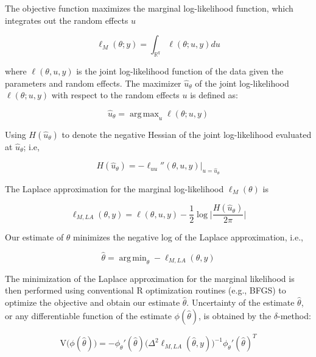 \documentclass[preprint, 3p,
authoryear]{elsarticle} %
\begin{document}
The objective function maximizes the marginal log-likelihood function,
which integrates out the random effects \(u\)

\begin{equation}
  \ell_{M}(\theta; y)=\int_{\mathbb{R}^{q}} \ell (\theta;u,y) du
\end{equation}

where \(\ell(\theta, u,y)\) is the joint log-likelihood function of the
data given the parameters and random effects. The maximizer
\(\hat{u}_{\theta}\) of the joint log-likelihood \(\ell(\theta;u,y)\)
with respect to the random effects \(u\) is defined as:

\begin{equation}
  \hat{u}_{\theta}=\mathop{\mathrm{arg\,max}}_{u} \ell(\theta;u,y)
\end{equation}

Using \(H(\hat{u}_{\theta})\) to denote the negative Hessian of the
joint log-likelihood evaluated at \(\hat{u}_{\theta}\); i.e,

\begin{equation}
  H(\hat{u}_{\theta}) =-\ell_{uu}''(\theta, u, y)|_{u=\hat{u}_{\theta}}
\end{equation}

The Laplace approximation for the marginal log-likelihood
\(\ell_M(\theta)\) is

\begin{equation}
  \ell_{M,LA}(\theta, y)=\ell(\theta,u,y)-\frac{1}{2}\log \Big|\frac{H(\hat{u}_{\theta})}{2\pi}\Big|
\end{equation}

Our estimate of \(\theta\) minimizes the negative log of the Laplace
approximation, i.e.,

\begin{equation}
  \hat{\theta}=\mathop{\mathrm{arg\,min}}_{\theta} - \ell_{M, LA}(\theta, y)
\end{equation}

The minimization of the Laplace approximation for the marginal
likelihood is then performed using conventional R optimization routines
(e.g., BFGS) to optimize the objective and obtain our estimate
\(\hat{\theta}\). Uncertainty of the estimate \(\hat{\theta}\), or any
differentiable function of the estimate \(\phi(\hat{\theta})\), is
obtained by the \(\delta\)-method:

\begin{equation}
  \mathrm{V}\big(\phi(\hat{\theta})\big)=-\phi_{\theta}'(\hat{\theta})\Big(\Delta^2 \ell_{M,LA}(\hat{\theta}, y)\Big)^{-1} \phi_{\theta}'(\hat{\theta})^T
\end{equation}
\end{document}
